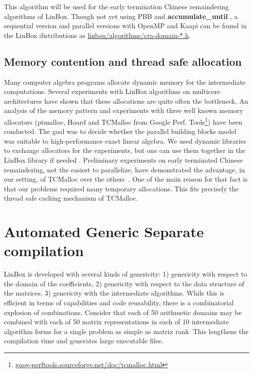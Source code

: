 \documentclass[runningheads,a4paper]{llncs}
\newcommand{\linbox}{{\sc LinBox}\xspace}
\newcommand{\accumulatewhile}{ \textbf{accumulate\_until} }
\begin{document}
This algorithm will be used 
for the early termination Chinese remaindering algorithms of
\linbox. Though not yet using PBB and \accumulatewhile, a
sequential version and parallel versions with OpenMP and
Kaapi can be found in the \linbox distributions as 
\url{linbox/algorithms/cra-domain-*.h}.



\subsection{Memory contention and thread safe allocation}
Many computer algebra programs allocate dynamic memory for the
intermediate computations. Several experiments with \linbox
algorithms on multicore architectures have shown that these
allocations are quite often the bottleneck.
An analysis of the memory pattern and experiments with three well
known memory allocators 
(ptmalloc, Hoard and TCMalloc from Google Perf. Tools\footnote{\url{goog-perftools.sourceforge.net/doc/tcmalloc.html}})
have been conducted. The goal was to decide whether the parallel
building blocks model was suitable to high-performance exact linear
algebra. We used dynamic libraries to exchange allocators for the
experiments, but one can use them together in the \linbox library if
needed \cite[\S 7]{kaltofen:2005:memory}.
%
Preliminary experiments on early terminated Chinese remaindering,
not the easiest to parallelize, have demonstrated the advantage, in
our setting, of TCMalloc over the others~\cite{jgd:2010:crt}.
One of the main reason for that fact is that our problems required
many temporary allocations. This fits precisely the thread safe caching
mechanism of TCMalloc.
%
\section{Automated Generic Separate compilation}
\linbox is developed with several kinds of genericity:
1) genericity with respect to the domain of the coefficients,
2) genericity with respect to the data structure of the matrices,
3) genericity with the intermediate algorithms.
While this is efficient in terms of capabilities and code reusability, there is a combinatorial explosion of combinations.  Consider that each of 50 arithmetic domains may be combined with each of 50 matrix representations in each of 10 intermediate algorithm forms for a single problem as simple as matrix rank. This
lengthens the compilation time and generates large executable files.
\end{document}
